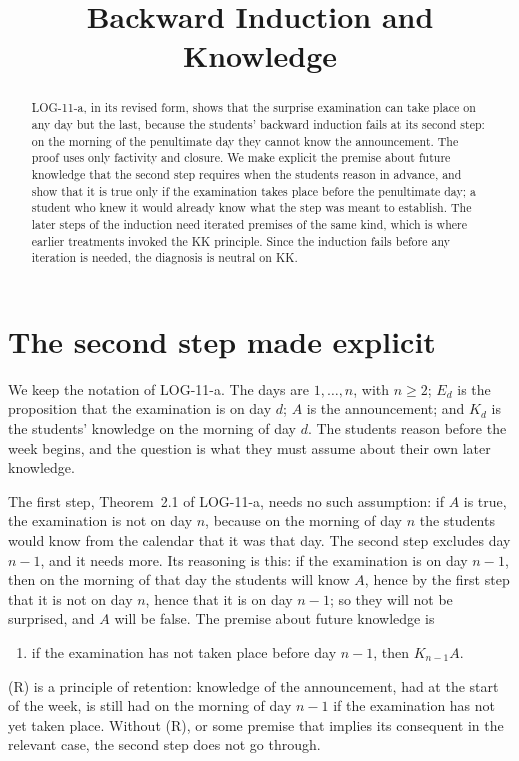 \documentclass{situationist-preprint}
\title{Backward Induction and Knowledge}
\begin{document}
\maketitle

\begin{abstract}
LOG-11-a, in its revised form, shows that the surprise examination can take place on any day but the last, because the students' backward induction fails at its second step: on the morning of the penultimate day they cannot know the announcement. The proof uses only factivity and closure. We make explicit the premise about future knowledge that the second step requires when the students reason in advance, and show that it is true only if the examination takes place before the penultimate day; a student who knew it would already know what the step was meant to establish. The later steps of the induction need iterated premises of the same kind, which is where earlier treatments invoked the KK principle. Since the induction fails before any iteration is needed, the diagnosis is neutral on KK.
\end{abstract}

\section{The second step made explicit}

We keep the notation of LOG-11-a. The days are $1, \ldots, n$, with $n \geq 2$; $E_d$ is the proposition that the examination is on day $d$; $A$ is the announcement; and $K_d$ is the students' knowledge on the morning of day $d$. The students reason before the week begins, and the question is what they must assume about their own later knowledge.

The first step, Theorem~2.1 of LOG-11-a, needs no such assumption: if $A$ is true, the examination is not on day $n$, because on the morning of day $n$ the students would know from the calendar that it was that day. The second step excludes day $n-1$, and it needs more. Its reasoning is this: if the examination is on day $n-1$, then on the morning of that day the students will know $A$, hence by the first step that it is not on day $n$, hence that it is on day $n-1$; so they will not be surprised, and $A$ will be false. The premise about future knowledge is
\begin{enumerate}[label=(R)]
\item if the examination has not taken place before day $n-1$, then $K_{n-1} A$.
\end{enumerate}
(R) is a principle of retention: knowledge of the announcement, had at the start of the week, is still had on the morning of day $n-1$ if the examination has not yet taken place. Without (R), or some premise that implies its consequent in the relevant case, the second step does not go through.
\end{document}
